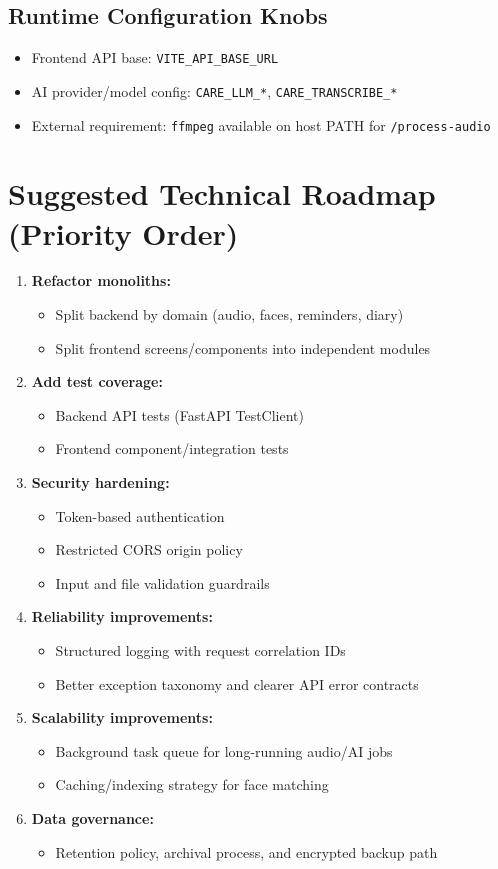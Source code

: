 \documentclass[12pt,a4paper]{article}
\begin{document}
\subsection{Runtime Configuration Knobs}
\begin{itemize}
  \item Frontend API base: \texttt{VITE\_API\_BASE\_URL}
  \item AI provider/model config: \texttt{CARE\_LLM\_*}, \texttt{CARE\_TRANSCRIBE\_*}
  \item External requirement: \texttt{ffmpeg} available on host PATH for \texttt{/process-audio}
\end{itemize}

\section{Suggested Technical Roadmap (Priority Order)}
\begin{enumerate}
  \item \textbf{Refactor monoliths:}
  \begin{itemize}
    \item Split backend by domain (audio, faces, reminders, diary)
    \item Split frontend screens/components into independent modules
  \end{itemize}
  \item \textbf{Add test coverage:}
  \begin{itemize}
    \item Backend API tests (FastAPI TestClient)
    \item Frontend component/integration tests
  \end{itemize}
  \item \textbf{Security hardening:}
  \begin{itemize}
    \item Token-based authentication
    \item Restricted CORS origin policy
    \item Input and file validation guardrails
  \end{itemize}
  \item \textbf{Reliability improvements:}
  \begin{itemize}
    \item Structured logging with request correlation IDs
    \item Better exception taxonomy and clearer API error contracts
  \end{itemize}
  \item \textbf{Scalability improvements:}
  \begin{itemize}
    \item Background task queue for long-running audio/AI jobs
    \item Caching/indexing strategy for face matching
  \end{itemize}
  \item \textbf{Data governance:}
  \begin{itemize}
    \item Retention policy, archival process, and encrypted backup path
  \end{itemize}
\end{enumerate}
\end{document}
